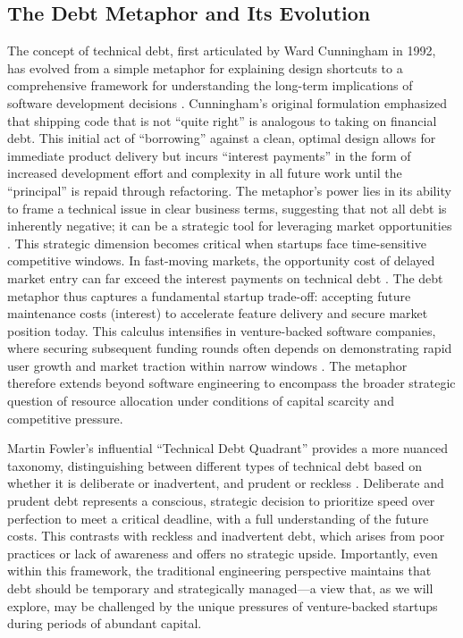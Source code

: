 \subsection{The Debt Metaphor and Its Evolution}
The concept of technical debt, first articulated by Ward Cunningham in 1992, has evolved from a simple metaphor for explaining design shortcuts to a comprehensive framework for understanding the long-term implications of software development decisions \citep{cunningham1992wycash}. Cunningham's original formulation emphasized that shipping code that is not ``quite right'' is analogous to taking on financial debt. This initial act of ``borrowing'' against a clean, optimal design allows for immediate product delivery but incurs ``interest payments'' in the form of increased development effort and complexity in all future work until the ``principal'' is repaid through refactoring. The metaphor's power lies in its ability to frame a technical issue in clear business terms, suggesting that not all debt is inherently negative; it can be a strategic tool for leveraging market opportunities \citep{seaman2012using}. This strategic dimension becomes critical when startups face time-sensitive competitive windows. In fast-moving markets, the opportunity cost of delayed market entry can far exceed the interest payments on technical debt \citep{curtis2012estimating}. The debt metaphor thus captures a fundamental startup trade-off: accepting future maintenance costs (interest) to accelerate feature delivery and secure market position today. This calculus intensifies in venture-backed software companies, where securing subsequent funding rounds often depends on demonstrating rapid user growth and market traction within narrow windows \citep{lee2024startups}. The metaphor therefore extends beyond software engineering to encompass the broader strategic question of resource allocation under conditions of capital scarcity and competitive pressure.

Martin Fowler's influential ``Technical Debt Quadrant'' provides a more nuanced taxonomy, distinguishing between different types of technical debt based on whether it is deliberate or inadvertent, and prudent or reckless \citep{fowler2009technical}. Deliberate and prudent debt represents a conscious, strategic decision to prioritize speed over perfection to meet a critical deadline, with a full understanding of the future costs. This contrasts with reckless and inadvertent debt, which arises from poor practices or lack of awareness and offers no strategic upside. Importantly, even within this framework, the traditional engineering perspective maintains that debt should be temporary and strategically managed—a view that, as we will explore, may be challenged by the unique pressures of venture-backed startups during periods of abundant capital.

